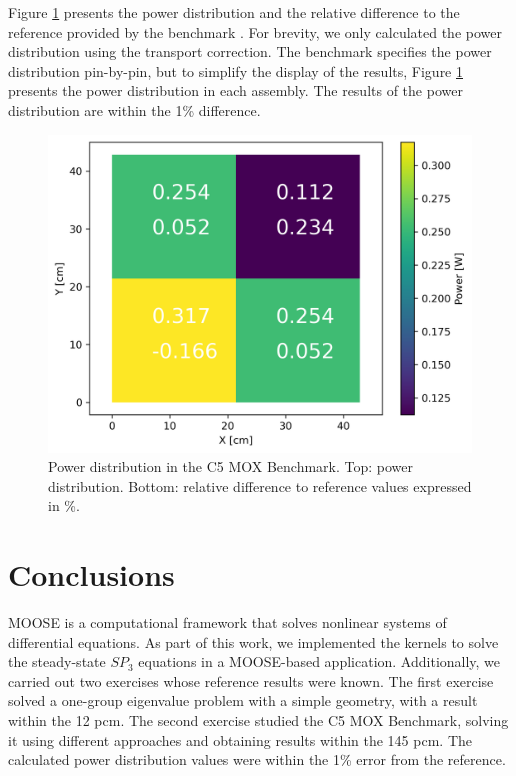 \documentclass{anstrans}
\begin{document}
Figure \ref{fig:power-distrib} presents the power distribution and the relative difference to the reference provided by the benchmark \cite{cavarec_benchmark_1994}.
For brevity, we only calculated the power distribution using the transport correction.
The benchmark specifies the power distribution pin-by-pin, but to simplify the display of the results, Figure \ref{fig:power-distrib} presents the power distribution in each assembly.
The results of the power distribution are within the 1\% difference.

\begin{figure}[htbp!] %
    \centering
    \includegraphics[width=0.95\linewidth]{figures/distrib.png}
    \hfill
    \caption{Power distribution in the C5 MOX Benchmark. Top: power distribution. Bottom: relative difference to reference values expressed in \%.}
    \label{fig:power-distrib}
\end{figure}


\section{Conclusions}

MOOSE is a computational framework that solves nonlinear systems of differential equations.
As part of this work, we implemented the kernels to solve the steady-state $SP_3$ equations in a MOOSE-based application.
Additionally, we carried out two exercises whose reference results were known.
The first exercise solved a one-group eigenvalue problem with a simple geometry, with a result within the 12 pcm.
The second exercise studied the C5 MOX Benchmark, solving it using different approaches and obtaining results within the 145 pcm.
The calculated power distribution values were within the 1\% error from the reference.
\end{document}
